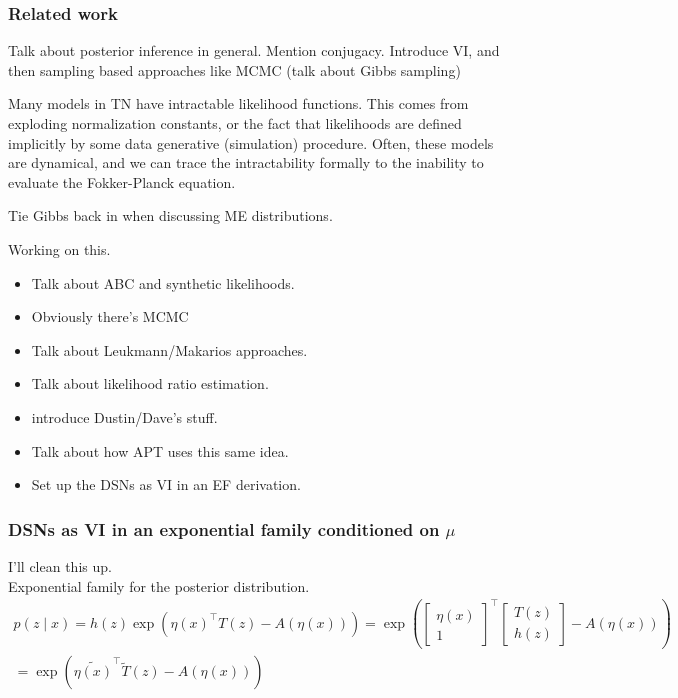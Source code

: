 \documentclass[11pt]{article}
\begin{document}
\subsubsection{Related work}
Talk about posterior inference in general.  Mention conjugacy.  Introduce VI, and then sampling based approaches like MCMC (talk about Gibbs sampling)

Many models in TN have intractable likelihood functions.  This comes from exploding normalization constants, or the fact that likelihoods are defined implicitly by some data generative (simulation) procedure.  Often, these models are dynamical, and we can trace the intractability formally to the inability to evaluate the Fokker-Planck equation. 

Tie Gibbs back in when discussing ME distributions.

Working on this.
\begin{itemize}
\item Talk about ABC and synthetic likelihoods.
\item Obviously there's MCMC
\item Talk about Leukmann/Makarios approaches.
\item Talk about likelihood ratio estimation.
\item introduce Dustin/Dave's stuff.
\item Talk about how APT uses this same idea.
\item Set up the DSNs as VI in an EF derivation.
\end{itemize}

\subsubsection{DSNs as VI in an exponential family conditioned on $\mu$}
I'll clean this up. \\

Exponential family for the posterior distribution.
\begin{equation}
\begin{split}
p(z \mid x) = h(z) \exp{\left( \eta(x)^\top T(z) - A(\eta(x)) \right)} = \exp{\left( \begin{bmatrix} \eta(x) \\ 1 \end{bmatrix}^\top \begin{bmatrix} T(z) \\ h(z) \end{bmatrix} - A(\eta(x)) \right)} \\= \exp{\left(\tilde{\eta(x)}^\top \tilde{T}(z) - A(\eta(x)) \right)} 
\end{split}
\end{equation}
\end{document}
